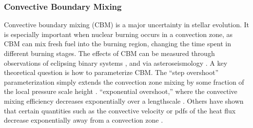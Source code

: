 {\color{purple}
\subsubsection{Convective Boundary Mixing}
}

Convective boundary mixing (CBM) is a major uncertainty in stellar evolution. It is especially important when nuclear burning occurs in a convection zone, as CBM can mix fresh fuel into the burning region, changing the time spent in different burning stages. The effects of CBM can be measured through observations of eclipsing binary systems \citep[e.g.,][]{Stancliffe_2015,claret:16,Valle_2016}, and via asteroseismology \citep[e.g.,][]{Constantino:2015,deheuvels:16,Ghasemi_2016}. A key theoretical question is how to parameterize CBM. The ``step overshoot'' parameterization simply extends the convection zone mixing by some fraction of the local pressure scale height \citep[e.g.,][]{Shaviv_1973}. ``exponential overshoot,'' where the convective mixing efficiency decreases exponentially over a lengthscale \citep{Freytag1996}. Others have shown that certain quantities such as the convective velocity or pdfs of the heat flux decrease exponentially away from a convection zone \citep{Pratt_2017}.